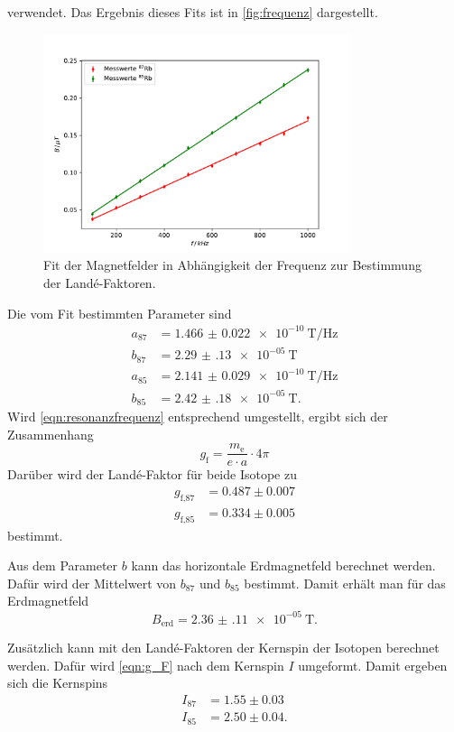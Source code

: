 verwendet.
Das Ergebnis dieses Fits ist in \autoref{fig:frequenz} dargestellt.
\begin{figure}
    \centering
    \includegraphics[width=0.8\textwidth]{plots/frequenz.pdf}
    \caption{Fit der Magnetfelder in Abhängigkeit der Frequenz zur Bestimmung der Landé-Faktoren.}
    \label{fig:frequenz}
\end{figure}
Die vom Fit bestimmten Parameter sind 
\begin{align*}
    a_\text{87} &= \qty{1.466(22)e-10}{\tesla\per\hertz} \\
    b_\text{87} &= \qty{2.29(13)e-05}{\tesla} \\
    a_\text{85} &= \qty{2.141(29)e-10}{\tesla\per\hertz} \\
    b_\text{85} &= \qty{2.42(18)e-05}{\tesla}.
\end{align*}
Wird \autoref{eqn:resonanzfrequenz} entsprechend umgestellt, ergibt sich der Zusammenhang
\begin{equation}
    g_\text{f} = \frac{m_\text{e}}{e \cdot a} \cdot 4\pi 
\end{equation}
Darüber wird der Landé-Faktor für beide Isotope zu
\begin{align*}
    g_\text{f,87} &= 0.487 \pm 0.007 \\
    g_\text{f,85} &= 0.334 \pm 0.005
\end{align*}
bestimmt.

Aus dem Parameter $b$ kann das horizontale Erdmagnetfeld berechnet werden.
Dafür wird der Mittelwert von $b_\text{87}$ und $b_\text{85}$ bestimmt.
Damit erhält man für das Erdmagnetfeld
\begin{equation*}
    B_\text{erd} = \qty{2.36(11)e-05}{\tesla}.
\end{equation*}

Zusätzlich kann mit den Landé-Faktoren der Kernspin der Isotopen berechnet werden.
Dafür wird \autoref{eqn:g_F} nach dem Kernspin $I$ umgeformt.
Damit ergeben sich die Kernspins 
\begin{align*}
    I_\text{87} &= 1.55 \pm 0.03 \\
    I_\text{85} &= 2.50 \pm 0.04.
\end{align*}

